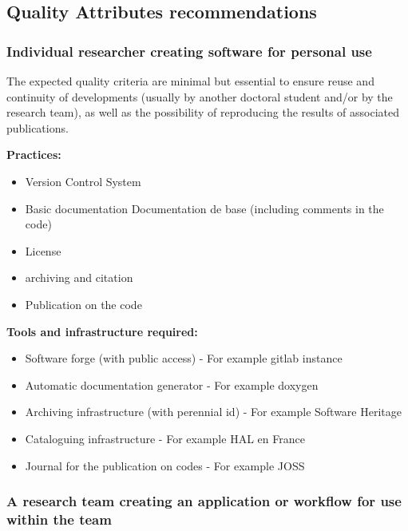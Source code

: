 \subsection{Quality Attributes recommendations}


\subsubsection{Individual researcher creating software for personal use} 

The expected quality criteria are minimal but essential to ensure
reuse and continuity of developments (usually by another doctoral
student and/or by the research team), as well as the possibility of
reproducing the results of associated publications. 

{\bf Practices:}
\begin{itemize}
\item Version Control System
\item Basic documentation Documentation de base (including comments in the code)
\item License 
\item archiving and citation
\item Publication on the code
\end{itemize}

{\bf Tools and infrastructure required:}
\begin{itemize}
\item Software forge (with public access) - For example gitlab instance
\item Automatic documentation generator - For example doxygen
\item Archiving infrastructure (with perennial id) - For example Software Heritage
\item Cataloguing infrastructure - For example HAL en France
\item Journal for the publication on codes - For example JOSS
\end{itemize}


\subsubsection{A research team creating an application or workflow for use within the team}

